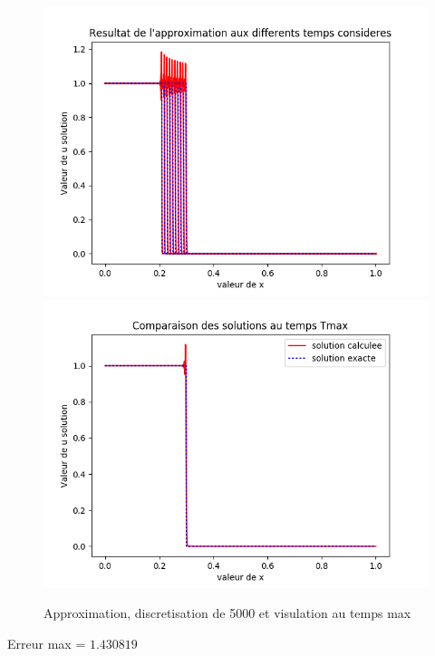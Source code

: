 \documentclass[12pt]{article}
\begin{document}
 \begin{figure}[H]
	\centering
	\includegraphics[scale=0.40]{1D_c1_5000_init3.png}
	\includegraphics[scale=0.40]{Temp_max_c1_5000_init3.png}
	\caption{Approximation, discretisation de 5000 et visulation au temps max}
	\label{1D}
	\end{figure}
Erreur max = $1.430819$
\end{document}
